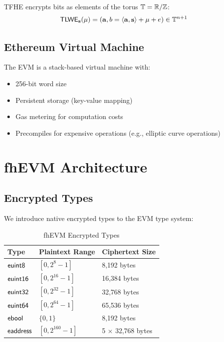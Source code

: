 \documentclass{../shared/luxfhe}
\begin{document}
TFHE encrypts bits as elements of the torus $\mathbb{T} = \mathbb{R}/\mathbb{Z}$:
\begin{align}
\mathsf{TLWE}_\mathbf{s}(\mu) &= (\mathbf{a}, b = \langle \mathbf{a}, \mathbf{s} \rangle + \mu + e) \in \mathbb{T}^{n+1}
\end{align}

\subsection{Ethereum Virtual Machine}

The EVM is a stack-based virtual machine with:
\begin{itemize}[noitemsep]
    \item 256-bit word size
    \item Persistent storage (key-value mapping)
    \item Gas metering for computation costs
    \item Precompiles for expensive operations (e.g., elliptic curve operations)
\end{itemize}

\section{fhEVM Architecture}

\subsection{Encrypted Types}

We introduce native encrypted types to the EVM type system:

\begin{table}[h]
\centering
\caption{fhEVM Encrypted Types}
\begin{tabular}{lll}
\toprule
Type & Plaintext Range & Ciphertext Size \\
\midrule
$\mathsf{euint8}$ & $[0, 2^8-1]$ & 8,192 bytes \\
$\mathsf{euint16}$ & $[0, 2^{16}-1]$ & 16,384 bytes \\
$\mathsf{euint32}$ & $[0, 2^{32}-1]$ & 32,768 bytes \\
$\mathsf{euint64}$ & $[0, 2^{64}-1]$ & 65,536 bytes \\
$\mathsf{ebool}$ & $\{0, 1\}$ & 8,192 bytes \\
$\mathsf{eaddress}$ & $[0, 2^{160}-1]$ & 5 $\times$ 32,768 bytes \\
\bottomrule
\end{tabular}
\end{table}
\end{document}
